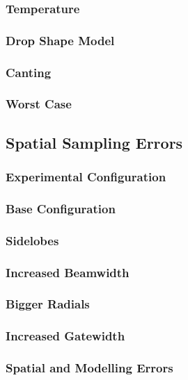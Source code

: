 \documentclass[red]{beamer}
\begin{document}
\begin{frame}
	\frametitle{Temperature}
\end{frame}

\begin{frame}
	\frametitle{Drop Shape Model}
\end{frame}

\begin{frame}
	\frametitle{Canting}
\end{frame}

\begin{frame}
	\frametitle{Worst Case}
\end{frame}

\subsection{Spatial Sampling Errors}
\begin{frame}
	\frametitle{Experimental Configuration}
\end{frame}

\begin{frame}
	\frametitle{Base Configuration}
\end{frame}

\begin{frame}
	\frametitle{Sidelobes}
\end{frame}

\begin{frame}
	\frametitle{Increased Beamwidth}
\end{frame}

\begin{frame}
	\frametitle{Bigger Radials}
\end{frame}

\begin{frame}
	\frametitle{Increased Gatewidth}
\end{frame}

\begin{frame}
	\frametitle{Spatial and Modelling Errors}
\end{frame}

\end{document}
